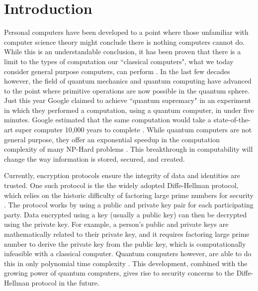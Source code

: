 \chapter{Introduction}
\label{chap:introduction}

Personal computers have been developed to a point where those unfamiliar with computer science theory might conclude there is nothing computers cannot do.
While this is an understandable conclusion, it has been proven that there is a limit to the types of computation our ``classical computers", what we today consider general purpose computers, can perform \cite{linz}.
In the last few decades however, the field of quantum mechanics and quantum computing have advanced to the point where primitive operations are now possible in the quantum sphere.
Just this year Google claimed to achieve ``quantum supremacy" in an experiment in which they performed a computation, using a quantum computer, in under five minutes. 
Google estimated that the same computation would take a state-of-the-art super computer 10,000 years to complete \cite{quantum_supremacy}. 
While quantum computers are not general purpose, they offer an exponential speedup in the computation complexity of many NP-Hard problems \cite{Grover:1996:FQM:237814.237866}.
This breakthrough in computability will change the way information is stored, secured, and created.

Currently, encryption protocols ensure the integrity of data and identities are trusted.
One such protocol is the the widely adopted Diffe-Hellman protocol, which relies on the historic difficulty of factoring large prime numbers for security \cite{qc:agi}.
The protocol works by using a public and private key pair for each participating party.
Data encrypted using a key (usually a public key) can then be decrypted using the private key.
For example, a person's public and private keys are mathematically related to their private key, and it requires factoring large prime number to derive the private key from the public key, which is computationally infeasible with a classical computer.
Quantum computers however, are able to do this in only polynomial time complexity \cite{doi:10.1137/S0036144598347011}.
This development, combined with the growing power of quantum computers, gives rise to security concerns to the Diffe-Hellman protocol in the future.


